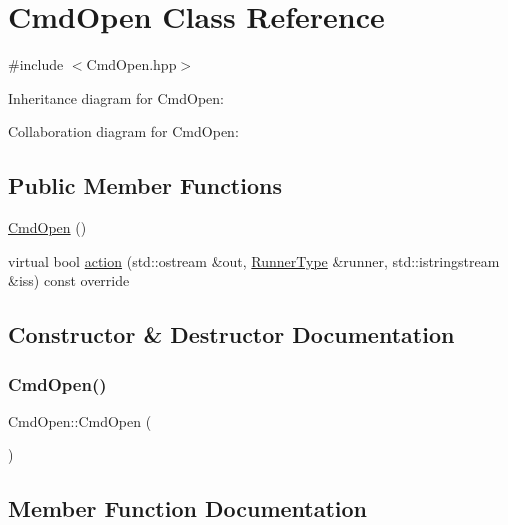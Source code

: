 \hypertarget{classCmdOpen}{}\section{Cmd\+Open Class Reference}
\label{classCmdOpen}


{\ttfamily \#include $<$Cmd\+Open.\+hpp$>$}



Inheritance diagram for Cmd\+Open\+:


Collaboration diagram for Cmd\+Open\+:
\subsection*{Public Member Functions}
\begin{DoxyCompactItemize}
\item 
\hyperlink{classCmdOpen_a2dba3a6273257100a1ea1d07335f3426}{Cmd\+Open} ()
\item 
virtual bool \hyperlink{classCmdOpen_adc72961afcb2a282e4e627273e111281}{action} (std\+::ostream \&out, \hyperlink{Command_8hpp_ad45c3de597c2023a8be0399d914161f4}{Runner\+Type} \&runner, std\+::istringstream \&iss) const override
\end{DoxyCompactItemize}


\subsection{Constructor \& Destructor Documentation}
\mbox{\label{classCmdOpen_a2dba3a6273257100a1ea1d07335f3426}} 
\subsubsection{\texorpdfstring{Cmd\+Open()}{CmdOpen()}}
{\footnotesize\ttfamily Cmd\+Open\+::\+Cmd\+Open (\begin{DoxyParamCaption}{ }\end{DoxyParamCaption})}



\subsection{Member Function Documentation}
\mbox{\label{classCmdOpen_adc72961afcb2a282e4e627273e111281}} 
